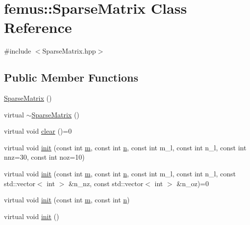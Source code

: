 \hypertarget{classfemus_1_1_sparse_matrix}{}\section{femus\+:\+:Sparse\+Matrix Class Reference}
\label{classfemus_1_1_sparse_matrix}


{\ttfamily \#include $<$Sparse\+Matrix.\+hpp$>$}

\subsection*{Public Member Functions}
\begin{DoxyCompactItemize}
\item 
\mbox{\hyperlink{classfemus_1_1_sparse_matrix_a9946a998639408446832117bb50b3d2c}{Sparse\+Matrix}} ()
\item 
virtual \mbox{\hyperlink{classfemus_1_1_sparse_matrix_ab21b1797ec05f01989ef4058843e2724}{$\sim$\+Sparse\+Matrix}} ()
\item 
virtual void \mbox{\hyperlink{classfemus_1_1_sparse_matrix_aa737406132c93b1ea7e6684c4c8b6fa4}{clear}} ()=0
\item 
virtual void \mbox{\hyperlink{classfemus_1_1_sparse_matrix_a531f103b054502698cbe01767640861d}{init}} (const int \mbox{\hyperlink{classfemus_1_1_sparse_matrix_a5f38aba83ed856290810a321a28480a7}{m}}, const int \mbox{\hyperlink{classfemus_1_1_sparse_matrix_aac007c0926a2f3ffe6f01ba97608ea15}{n}}, const int m\+\_\+l, const int n\+\_\+l, const int nnz=30, const int noz=10)
\item 
virtual void \mbox{\hyperlink{classfemus_1_1_sparse_matrix_ac07bdd8037bcf0cde19c2e0e42f3775c}{init}} (const int \mbox{\hyperlink{classfemus_1_1_sparse_matrix_a5f38aba83ed856290810a321a28480a7}{m}}, const int \mbox{\hyperlink{classfemus_1_1_sparse_matrix_aac007c0926a2f3ffe6f01ba97608ea15}{n}}, const int m\+\_\+l, const int n\+\_\+l, const std\+::vector$<$ int $>$ \&n\+\_\+nz, const std\+::vector$<$ int $>$ \&n\+\_\+oz)=0
\item 
virtual void \mbox{\hyperlink{classfemus_1_1_sparse_matrix_aa33ea61eb0f2ccfb81ef3f2a93368ab3}{init}} (const int \mbox{\hyperlink{classfemus_1_1_sparse_matrix_a5f38aba83ed856290810a321a28480a7}{m}}, const int \mbox{\hyperlink{classfemus_1_1_sparse_matrix_aac007c0926a2f3ffe6f01ba97608ea15}{n}})
\item 
virtual void \mbox{\hyperlink{classfemus_1_1_sparse_matrix_adb6027c6f2f5fd54e004ced773b58259}{init}} ()
\item 

\end{DoxyCompactItemize}
